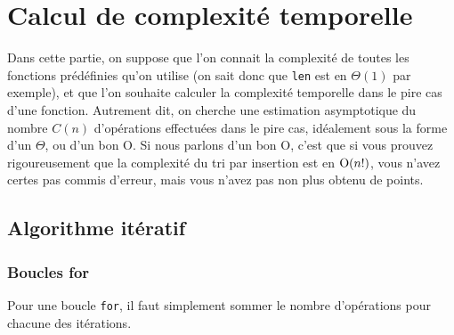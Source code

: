 \documentclass{magnolia}
\begin{document}



\section{Calcul de complexité temporelle}

Dans cette partie, on suppose que l'on connait la complexité de toutes
les fonctions prédéfinies qu'on utilise (on sait donc que \verb!len!
est en $\Theta(1)$  par
exemple), et que l'on souhaite calculer la complexité temporelle dans
le pire cas d'une fonction. Autrement dit, on cherche une estimation asymptotique
du nombre $C(n)$ d'opérations effectuées dans le pire cas, idéalement sous
la forme d'un $\Theta$, ou d'un \og bon \fg O. Si nous parlons d'un
bon \og O\fg , c'est que si 
  vous prouvez rigoureusement que
  la complexité du tri par insertion est en ${\rm O}(n!)$, vous n'avez
  certes pas commis d'erreur, mais vous n'avez pas non plus obtenu de points.

\subsection{Algorithme itératif}

\subsubsection{Boucles for}

Pour une boucle \verb_for_, il faut simplement sommer le nombre d'opérations pour chacune des
itérations.\\
\end{document}
